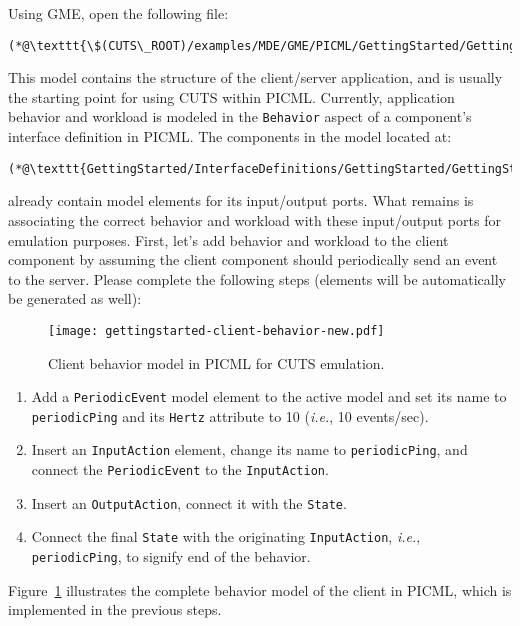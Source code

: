 Using GME, open the following file: 
\begin{lstlisting}
(*@\texttt{\$(CUTS\_ROOT)/examples/MDE/GME/PICML/GettingStarted/GettingStarted.xme}@*)
\end{lstlisting}
This model contains the structure of the client/\-server application, and 
is usually the starting point for using CUTS within PICML. 
Currently, application behavior and workload is modeled in the \texttt{Behavior}
aspect of a component's interface definition in PICML. The components in the model
located at:
\begin{lstlisting}
(*@\texttt{GettingStarted/InterfaceDefinitions/GettingStarted/GettingStarted}@*)
\end{lstlisting}
already contain model elements for its input/\-output ports. What remains is associating
the correct behavior and workload with these input/\-output ports for emulation
purposes. First, let's add behavior and workload to the client component by 
assuming the client component should periodically send an event to the server.
Please complete the following steps (elements will be automatically be generated
as well):
\begin{figure}[htbp]
  \centering
  \texttt{[image: gettingstarted-client-behavior-new.pdf]}
  \caption{Client behavior model in PICML for CUTS emulation.}
  \label{fig:gettingstarted-client-behavior}
\end{figure}
\begin{enumerate}
  \item Add a \texttt{PeriodicEvent} model element to the active model and 
  set its name to \texttt{periodicPing} and its \texttt{Hertz} attribute to 
  10 (\textit{i.e.}, 10 events/sec). 
  
  \item Insert an \texttt{InputAction} element, change its name to 
  \texttt{periodicPing}, and connect the \texttt{PeriodicEvent} to 
  the \texttt{InputAction}.

  \item Insert an \texttt{OutputAction}, connect it with the \texttt{State}.

  \item Connect the final \texttt{State} with the originating \texttt{InputAction},
  \textit{i.e.}, \texttt{periodicPing}, to signify end of the behavior.
\end{enumerate}
Figure~\ref{fig:gettingstarted-client-behavior} illustrates the complete behavior 
model of the client in PICML, which is implemented in the previous steps.

